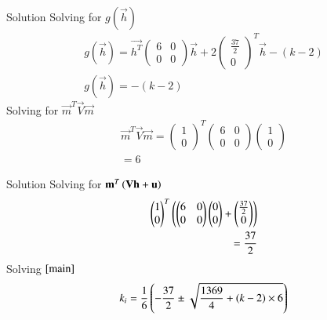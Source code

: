 \documentclass{beamer}
\begin{document}
\begin{frame}{Solution}
Solving for $g(\vec{h})$
\begin{align}
    g(\vec{h})=\vec{h^T}\begin{pmatrix}6&0\\0&0\end{pmatrix}\vec{h}+2\begin{pmatrix}\frac{37}{2}\\0\end{pmatrix}^T\vec{h}-(k-2) \\
    g(\vec{h})=-(k-2) \label{g}
\end{align}
Solving for $\vec{m}^T\vec{V}\vec{m}$
\begin{align}
    \vec{m}^T\vec{V}\vec{m}=\begin{pmatrix}1 \\0\end{pmatrix}^T\begin{pmatrix}6&0\\0&0\end{pmatrix}\begin{pmatrix}1 \\ 0\end{pmatrix}\\
    =6\label{mv}
\end{align}
\end{frame}
\begin{frame}{Solution}
Solving for $\mathbf{m}^T\left(\mathbf{V}\mathbf{h}+\mathbf{u}\right)$
\begin{align}
    \begin{pmatrix}1 \\ 0\end{pmatrix}^T\left(\begin{pmatrix}6&0\\0&0\end{pmatrix}\begin{pmatrix}0\\0\end{pmatrix}+\begin{pmatrix}\frac{37}{2}\\0\end{pmatrix}\right)\\
    =\frac{37}{2}
\end{align}
Solving $\eqref{main}$
\begin{align}
    k_i=\frac{1}{6}\left(-\frac{37}{2} \pm \sqrt{\frac{1369}{4} +(k-2)\times 6}\right)
\end{align}
\end{frame}
\end{document}
